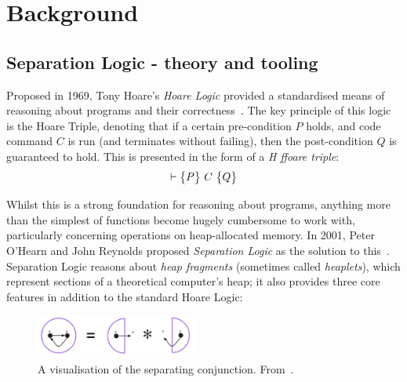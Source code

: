 
\chapter{Background}
\label{sec:background}

\section{Separation Logic - theory and tooling}
\label{sec:background:sl-and-tools}

Proposed in 1969, Tony Hoare's \textit{Hoare Logic} provided a standardised
means of reasoning about programs and their correctness~\cite{hoare}. The key
principle of this logic is the Hoare Triple, denoting that if a certain
pre-condition $P$ holds, and code command $C$ is run (and terminates without
failing), then the post-condition $Q$ is guaranteed to hold. This is presented
in the form of a \textit{H ffoare triple}:
$$
  \triple{P}{C}{Q}
$$

Whilst this is a strong foundation for reasoning about programs, anything more
than the simplest of functions become hugely cumbersome to work with,
particularly concerning operations on heap-allocated memory. In 2001, Peter
O'Hearn and John Reynolds proposed \textit{Separation Logic} as the solution to
this~\cite{separation-logic}. Separation Logic reasons about
\textit{heap fragments} (sometimes called \textit{heaplets}), which represent
sections of a theoretical computer's heap; it also provides three core features
in addition to the standard Hoare Logic:

\begin{figure}[!b]
  \centering
  \includegraphics[width=200px]{img/separating-conjunction.jpg}
  \caption{
    A visualisation of the separating conjunction.
    From~\cite{infer-sl}.
  }
  \label{fig:separating-conjunction}
\end{figure}

